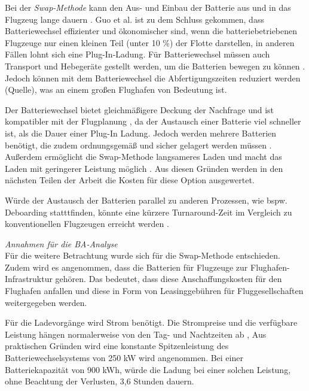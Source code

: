 Bei der \textit{Swap-Methode} kann den Aus- und Einbau der Batterie aus 
und in das Flugzeug lange dauern \cite{dalmia2022powering}. 
Guo et al. \cite{guo2020aviation} ist zu dem Schluss gekommen, 
dass Batteriewechsel effizienter und ökonomischer sind, 
wenn die batteriebetriebenen Flugzeuge nur einen kleinen Teil (unter 10 \%) der Flotte darstellen, 
in anderen Fällen lohnt sich eine Plug-In-Ladung. 
Für Batteriewechsel müssen auch Transport und Hebegeräte gestellt werden, 
um die Batterien bewegen zu können \cite{reimers2018introduction}.
Jedoch können mit dem Batteriewechsel die Abfertigungszeiten reduziert werden (Quelle), 
was an einem großen Flughafen von Bedeutung ist. 

Der Batteriewechsel bietet gleichmäßigere Deckung der Nachfrage \cite{guo2020aviation} 
und ist kompatibler mit der Flugplanung \cite{salucci2020optimal}, 
da der Austausch einer Batterie viel schneller ist, als die Dauer einer Plug-In Ladung. 
Jedoch werden mehrere Batterien benötigt, 
die zudem ordnungsgemäß und sicher gelagert werden müssen \cite{salucci2020optimal}.
Außerdem ermöglicht die Swap-Methode langsameres Laden und macht 
das Laden mit geringerer Leistung möglich \cite{avogadro2024demystifying}.
Aus diesen Gründen werden in den nächsten Teilen 
der Arbeit die Kosten für diese Option ausgewertet. 

Würde der Austausch der Batterien parallel zu anderen Prozessen, 
wie bspw. Deboarding statttfinden, könnte eine kürzere Turnaround-Zeit im 
Vergleich zu konventionellen Flugzeugen erreicht werden \cite{schmidt2016challenges}.

\textit{Annahmen für die BA-Analyse}\\
%
Für die weitere Betrachtung wurde sich für die Swap-Methode entschieden. 
Zudem wird es angenommen, dass die Batterien für Flugzeuge zur Flughafen-Infrastruktur gehören.
Das bedeutet, dass diese Anschaffungskosten für den Flughafen anfallen 
und diese in Form von Leasinggebühren für Fluggesellschaften weitergegeben werden.

Für die Ladevorgänge wird Strom benötigt. 
Die Strompreise und die verfügbare Leistung hängen normalerweise 
von den Tag- und Nachtzeiten ab \cite{salucci2020optimal}, 
Aus praktischen Gründen wird eine konstante Spitzenleistung des Batteriewechselsystems von 250 kW wird angenommen. 
Bei einer Batteriekapazität von 900 kWh, würde die Ladung bei einer solchen Leistung, 
ohne Beachtung der Verlusten, 3,6 Stunden dauern.

